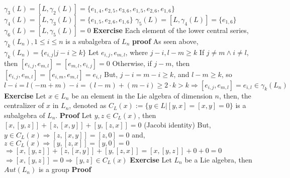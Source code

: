\documentclass[12pt]{article}
\begin{document}
$\gamma_3(L)=[L,\gamma_2(L)]=\{e_{1,4},e_{2,5},e_{3,6},e_{1,5},e_{2,6},e_{1,6}\}$ 
\newline
$\gamma_4(L)=[L,\gamma_3(L)]=\{e_{1,5},e_{2,6},e_{1,6}\}$ 
\newline
$\gamma_5(L)=[L,\gamma_4(L)]=\{e_{1,6}\}$ 
\newline
$\gamma_6(L)=[L,\gamma_5(L)]=0$ 
\newline \newline
\textbf{Exercise} Each element of the lower central series, $\gamma_k(L_n),1 \leq i \leq n$ is a subalgebra of $L_n$ \newline \newline
\textbf{proof} \newline 
As seen above, $\gamma_k(L_n)=\{e_{i,j} | j-i \geq k\}$ \newline
Let $e_{i,j},e_{m,l}$, where $j-i,l-m \geq k$ \newline
If $j \neq m \wedge i \neq l$, then $[e_{i,j},e_{m,l}]=[e_{m,l},e_{i,j}]=0$ \newline
Otherwise, if $j-m$, then $[e_{i,j},e_{m,l}]=[e_{i,m},e_{m,l}]=e_{i,l}$ \newline
But, $j-i=m-i \geq k$, and $l-m \geq k$, so $l-i=l(-m+m)-i=(l-m)+(m-i) \geq 2 \cdot k>k \Rightarrow [e_{i,j},e_{m,l}]=e_{i,l} \in \gamma_k(L_n)$
\newpage
\textbf{Exercise} Let $x \in L_n$ be an element in the Lie algebra of dimension $n$, then, the centralizer of $x$ in $L_n$, denoted as \newline $C_L(x):=\{y \in L | [y,x]=[x,y]=0\}$ \newline
is a subalgebra of $L_n$. \newline \newline
\textbf{Proof} \newline
Let $y,z \in C_L(x)$, then $[x,[y,z]]+[z,[x,y]]+[y,[z,x]]=0$ (Jacobi identity) \newline
But, $y \in C_L(x) \Rightarrow [z,[x,y]]=[z,0]=0$ \newline
and, $z \in C_L(x) \Rightarrow [y,[z,x]]=[y,0]=0$ \newline
$\Rightarrow [x,[y,z]]+[z,[x,y]]+[y,[z,x]]=[x,[y,z]]+0+0=0$
\newline
$\Rightarrow [x,[y,z]]=0 \Rightarrow [y,z] \in C_L(x)$ 
\newline
\newline
\textbf{Exercise} \newline
Let $L_n$ be a Lie algebra, then $Aut(L_n)$ is a group \newline
\textbf{Proof} \newline
\end{document}
